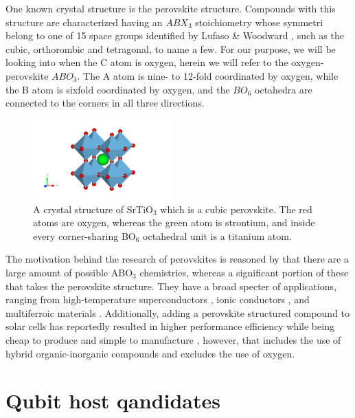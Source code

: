 \newpage



\newpage
One known crystal structure is the perovskite structure. Compounds with this structure are characterized having an $ABX_3$ stoichiometry whose symmetri belong to one of 15 space groups identified by Lufaso \& Woodward \cite{Lufaso2001}, such as the cubic, orthorombic and tetragonal, to name a few. For our purpose, we will be looking into when the C atom is oxygen, herein we will refer to the oxygen-perovskite $ABO_3$. The A atom is nine- to 12-fold coordinated by oxygen, while the B atom is sixfold coordinated by oxygen, and the $BO_6$ octahedra are connected to the corners in all three directions.

\begin{figure}
  \centering
  \includegraphics[width=0.48\textwidth]{theory/figures/SrTiO3_mp-5229_primitive.pdf}
  \caption{A crystal structure of SrTiO$_3$ which is a cubic perovskite. The red atoms are oxygen, whereas the green atom is strontium, and inside every corner-sharing BO$_6$ octahedral unit is a titanium atom.}
  \label{fig:pic}
\end{figure}

The motivation behind the research of perovskites is reasoned by that there are a large amount of possible ABO$_3$ chemistries, whereas a significant portion of these that takes the perovskite structure. They have a broad specter of applications, ranging from high-temperature superconductors \cite{Bednorz1988}, ionic conductors \cite{Boivin1998}, and  multiferroic materials \cite{Cheong2007}. Additionally, adding a perovskite structured compound to solar cells has reportedly resulted in higher performance efficiency while being cheap to produce and simple to manufacture \cite{IbnMohammed2017, Chen2014}, however, that includes the use of hybrid organic-inorganic compounds and excludes the use of oxygen.

\clearpage

\section{Qubit host qandidates}

